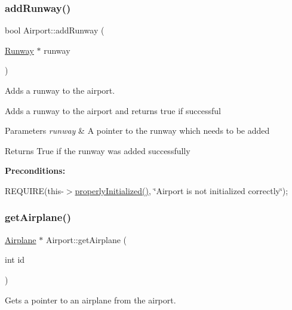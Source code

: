 \subsubsection{\texorpdfstring{add\+Runway()}{addRunway()}}
{\footnotesize\ttfamily bool Airport\+::add\+Runway (\begin{DoxyParamCaption}\item[{\mbox{\hyperlink{class_runway}{Runway}} $\ast$}]{runway }\end{DoxyParamCaption})}



Adds a runway to the airport. 

Adds a runway to the airport and returns true if successful


\begin{DoxyParams}{Parameters}
{\em runway} & A pointer to the runway which needs to be added \\
\hline
\end{DoxyParams}
\begin{DoxyReturn}{Returns}
True if the runway was added successfully
\end{DoxyReturn}
{\bfseries Preconditions\+:}
\begin{DoxyItemize}
\item R\+E\+Q\+U\+I\+RE(this-\/$>$\mbox{\hyperlink{class_airport_aa13e68ac58e8875837fbe888325cfff6}{properly\+Initialized()}}, \char`\"{}\+Airport is not initialized correctly\char`\"{}); 
\end{DoxyItemize}\mbox{\label{class_airport_a29db3fa31b450d90b9a81c9c55d4a320}} 
\subsubsection{\texorpdfstring{get\+Airplane()}{getAirplane()}}
{\footnotesize\ttfamily \mbox{\hyperlink{class_airplane}{Airplane}} $\ast$ Airport\+::get\+Airplane (\begin{DoxyParamCaption}\item[{int}]{id }\end{DoxyParamCaption})}



Gets a pointer to an airplane from the airport. 


